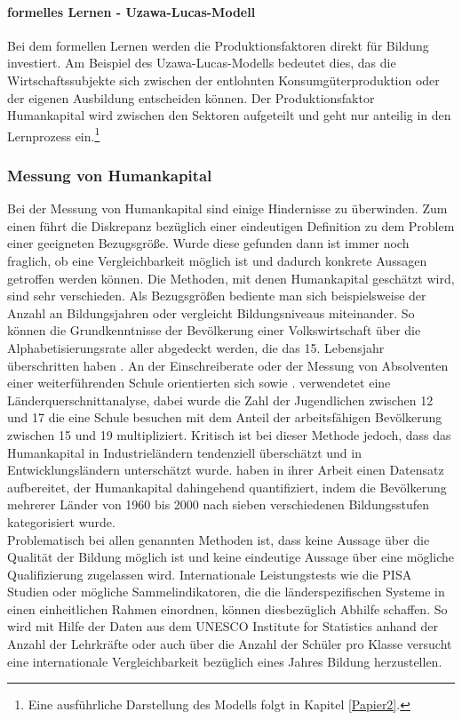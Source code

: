 \paragraph{formelles Lernen - Uzawa-Lucas-Modell}
Bei dem formellen Lernen werden die Produktionsfaktoren direkt für Bildung investiert. Am Beispiel des Uzawa-Lucas-Modells bedeutet dies, das die Wirtschaftssubjekte sich zwischen der entlohnten Konsumgüterproduktion oder der eigenen Ausbildung entscheiden können. Der Produktionsfaktor Humankapital wird zwischen den Sektoren aufgeteilt und geht nur anteilig in den Lernprozess ein.\footnote{Eine ausführliche Darstellung des Modells folgt in Kapitel \ref{Papier2}.}  


\subsubsection{Messung von Humankapital} 
Bei der Messung von Humankapital sind einige Hindernisse zu überwinden. Zum einen führt die Diskrepanz bezüglich einer eindeutigen Definition zu dem Problem einer geeigneten Bezugsgrö{\ss}e. Wurde diese gefunden dann ist immer noch fraglich, ob eine Vergleichbarkeit möglich ist und dadurch konkrete Aussagen getroffen werden können. Die Methoden, mit denen Humankapital gesch{\"a}tzt wird, sind sehr verschieden. Als Bezugsgrö{\ss}en bediente man sich beispielsweise der Anzahl an Bildungsjahren oder vergleicht Bildungsniveaus miteinander. So können die Grundkenntnisse der Bevölkerung einer Volkswirtschaft über die Alphabetisierungsrate aller abgedeckt werden, die das 15. Lebensjahr überschritten haben \citep{Romer.}. An der Einschreiberate oder der Messung von Absolventen einer weiterf{\"u}hrenden Schule orientierten sich \citet{Levine.1992} sowie \citet{Barro.2001}. \citet{Mankiw.1992} verwendetet eine L{\"a}nderquerschnittanalyse, dabei wurde die Zahl der Jugendlichen zwischen 12 und 17 die eine Schule besuchen mit dem Anteil der arbeitsf{\"a}higen Bev{\"o}lkerung zwischen 15 und 19 multipliziert. Kritisch ist bei dieser Methode jedoch, dass das Humankapital in Industrieländern tendenziell {\"u}bersch{\"a}tzt und in Entwicklungsländern untersch{\"a}tzt wurde.\newline 
\citet{Barro.2001} haben in ihrer Arbeit einen Datensatz aufbereitet, der Humankapital dahingehend quantifiziert, indem die Bev{\"o}lkerung mehrerer Länder von 1960 bis 2000 nach sieben verschiedenen Bildungsstufen kategorisiert wurde.\\
Problematisch bei allen genannten Methoden ist, dass keine Aussage {\"u}ber die Qualit{\"a}t der Bildung möglich ist und keine eindeutige Aussage {\"u}ber eine m{\"o}gliche Qualifizierung zugelassen wird. Internationale Leistungstests wie die PISA Studien oder mögliche Sammel\-indikatoren, die die l{\"a}nderspezifischen Systeme in einen einheitlichen Rahmen einordnen, können diesbezüglich Abhilfe schaffen. So wird mit Hilfe der Daten aus dem UNESCO Institute for Statistics anhand der Anzahl der Lehrkr{\"a}fte oder auch über die Anzahl der Sch{\"u}ler pro Klasse versucht eine internationale Vergleichbarkeit  bezüglich eines Jahres Bildung herzustellen. 


